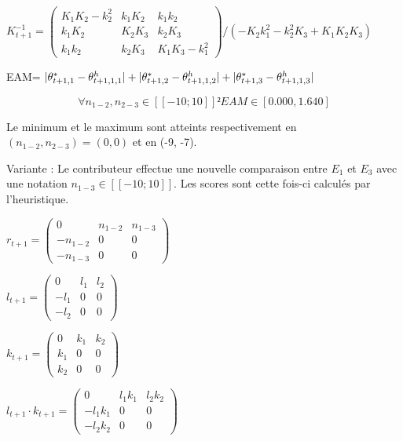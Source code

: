 $ K^{-1}_{t+1}= \left( \begin{array}{ccc} K_1 K_2-k_2^2 & k_1 K_2 & k_1 k_2 \\ k_1 K_2 & K_2 K_3 & k_2 K_3 \\ k_1 k_2 & k_2 K_3 & K_1 K_3-k_1^2 \end{array} \right)/(-K_2 k_1^2-k_2^2 K_3+K_1 K_2 K_3)$


EAM=  $|\theta^*_{t+1,1} - \theta^h_{t+1,1,1}|   +  |\theta^*_{t+1,2} - \theta^h_{t+1,1,2}|  +  |\theta^*_{t+1,3} - \theta^h_{t+1,1,3}|  $

\begin{equation*}
\forall{n_{1-2},n_{2-3}}\in [\![-10;10]\!]²  EAM \in [ 0.000,1.640 ]
\end{equation*}


Le minimum et le maximum sont atteints respectivement en $(n_{1-2},n_{2-3})=(0, 0)$ et en (-9, -7).








Variante : 
Le contributeur effectue une nouvelle comparaison entre $E_{1}$ et $E_{3}$ avec une notation $n_{1-3} \in [\![-10;10]\!]$. Les scores sont cette fois-ci calculés par l'heuristique.

$r_{t+1}= \begin{pmatrix}
0 & n_{1-2} &  n_{1-3} \\
-n_{1-2} & 0 & 0\\
 -n_{1-3}  & 0 & 0
\end{pmatrix}$

$l_{t+1}= \begin{pmatrix}
0 & l_1 & l_2\\
-l_1 & 0 & 0\\
-l_2 & 0 & 0
\end{pmatrix}
$

$k_{t+1}= \begin{pmatrix}
0 & k_1 &  k_2 \\
k_1 & 0 & 0 \\
 k_2 & 0 & 0
\end{pmatrix}
$


$l_{t+1} \cdot k_{t+1}= \begin{pmatrix}
0 & l_1 k_1 & l_2 k_2\\
-l_1 k_1 & 0 & 0\\
-l_2 k_2 & 0 & 0
\end{pmatrix}
$

